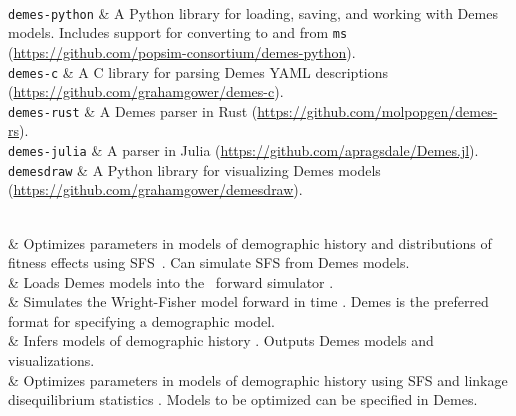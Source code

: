 \toprule
{}\\
\midrule
\texttt{demes-python} &
    A Python library for loading, saving, and working with
    Demes models. Includes support for converting to and from
    \texttt{ms}~\citep{hudson2002generating}
    (\url{https://github.com/popsim-consortium/demes-python}).\\

\texttt{demes-c} &
    A C library for parsing Demes YAML descriptions
    (\url{https://github.com/grahamgower/demes-c}). \\

\texttt{demes-rust} &
    A Demes parser in Rust
    (\url{https://github.com/molpopgen/demes-rs}). \\

\texttt{demes-julia} &
    A parser in Julia
    (\url{https://github.com/apragsdale/Demes.jl}). \\

\texttt{demesdraw} &
    A Python library for visualizing Demes models
    (\url{https://github.com/grahamgower/demesdraw}). \\

\midrule
{}\\
\midrule


\dadi &
   Optimizes parameters in models of demographic history and distributions of fitness effects using SFS~\citep{gutenkunst2009inferring}. Can simulate SFS from Demes models.
    \\
    
\demesslim &
    Loads Demes models into the \slim\ forward simulator \citep{haller2019slim}.\\
    
\fwdpy &
   Simulates the Wright-Fisher model forward in time \citep{thornton2014cpp,thornton2019-nu}. Demes is the preferred format for specifying a demographic model.\\

\gadma &
    Infers models of demographic history \citep{noskova2020gadma}. Outputs Demes models and visualizations. \\

\moments &
    Optimizes parameters in models of demographic history using SFS and linkage disequilibrium statistics
    \citep{jouganous2017inferring,ragsdale2019models}. Models to be optimized can be specified in Demes.\\


